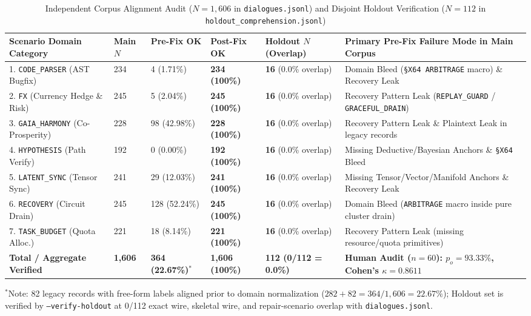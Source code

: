 \documentclass[9pt,a4paper]{extarticle}
\begin{document}
\begin{table}[h!]
\centering
\caption{Independent Corpus Alignment Audit ($N = 1{,}606$ in \texttt{dialogues.jsonl}) and Disjoint Holdout Verification ($N = 112$ in \texttt{holdout\_comprehension.jsonl})}
\label{tab:corpus_alignment}
\footnotesize
\renewcommand{\arraystretch}{0.96}
\setlength{\tabcolsep}{2.5pt}
\begin{tabularx}{\textwidth}{L{3.3cm} R{1.1cm} R{1.8cm} R{1.8cm} C{2.3cm} Y}
\toprule
{}
\textbf{\color{white}Scenario Domain Category} &
\textbf{\color{white}Main $N$} &
\textbf{\color{white}Pre-Fix OK} &
\textbf{\color{white}Post-Fix OK} &
\textbf{\color{white}Holdout $N$ (Overlap)} &
\textbf{\color{white}Primary Pre-Fix Failure Mode in Main Corpus} \\
. \texttt{CODE\_PARSER} (AST Bugfix) & 234 & 4 (1.71\%) & \textbf{234 (100\%)} & \textbf{16} (0.0\% overlap) & Domain Bleed (\texttt{\S X64 ARBITRAGE} macro) \& Recovery Leak \\
2. \texttt{FX} (Currency Hedge \& Risk) & 245 & 5 (2.04\%) & \textbf{245 (100\%)} & \textbf{16} (0.0\% overlap) & Recovery Pattern Leak (\texttt{REPLAY\_GUARD} / \texttt{GRACEFUL\_DRAIN}) \\
3. \texttt{GAIA\_HARMONY} (Co-Prosperity) & 228 & 98 (42.98\%) & \textbf{228 (100\%)} & \textbf{16} (0.0\% overlap) & Recovery Pattern Leak \& Plaintext Leak in legacy records \\
4. \texttt{HYPOTHESIS} (Path Verify) & 192 & 0 (0.00\%) & \textbf{192 (100\%)} & \textbf{16} (0.0\% overlap) & Missing Deductive/Bayesian Anchors \& \texttt{\S X64} Bleed \\
5. \texttt{LATENT\_SYNC} (Tensor Sync) & 241 & 29 (12.03\%) & \textbf{241 (100\%)} & \textbf{16} (0.0\% overlap) & Missing Tensor/Vector/Manifold Anchors \& Recovery Leak \\
6. \texttt{RECOVERY} (Circuit Drain) & 245 & 128 (52.24\%) & \textbf{245 (100\%)} & \textbf{16} (0.0\% overlap) & Domain Bleed (\texttt{ARBITRAGE} macro inside pure cluster drain) \\
7. \texttt{TASK\_BUDGET} (Quota Alloc.) & 221 & 18 (8.14\%) & \textbf{221 (100\%)} & \textbf{16} (0.0\% overlap) & Recovery Pattern Leak (missing resource/quota primitives) \\
\midrule
\textbf{Total / Aggregate Verified} & \textbf{1,606} & \textbf{364 (22.67\%)}$^*$ & \textbf{1,606 (100\%)} & \textbf{112 (0/112 = 0.0\%)} & \textbf{Human Audit ($n=60$): $p_o = 93.33\%$, Cohen's $\kappa = 0.8611$} \\
\bottomrule
\end{tabularx}
\vspace{0.8pt}
{\scriptsize $^*$Note: 82 legacy records with free-form labels aligned prior to domain normalization ($282 + 82 = 364/1{,}606 = 22.67\%$); Holdout set is verified by \texttt{--verify-holdout} at 0/112 exact wire, skeletal wire, and repair-scenario overlap with \texttt{dialogues.jsonl}.}
\end{table}
\end{document}
